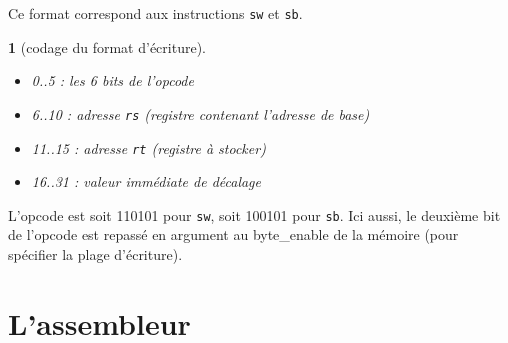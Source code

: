 \documentclass[13pt]{article}
\newtheorem{format}{  }
\begin{document}
Ce format correspond aux instructions \texttt{sw} et \texttt{sb}.

\begin{format}[codage du format d'écriture]
  \begin{itemize}
  \item 0..5 : les 6 bits de l'opcode
  \item 6..10 : adresse \texttt{rs} (registre contenant l'adresse de base) 
  \item 11..15 : adresse \texttt{rt} (registre à stocker)
  \item 16..31 : valeur immédiate de décalage
  \end{itemize}
\end{format}

L'opcode est soit 110101 pour \texttt{sw}, soit 100101 pour \texttt{sb}. Ici aussi, 
le deuxième bit de l'opcode est repassé en argument au byte\_enable
de la mémoire (pour spécifier la plage d'écriture).


\section{L'assembleur}
\end{document}
